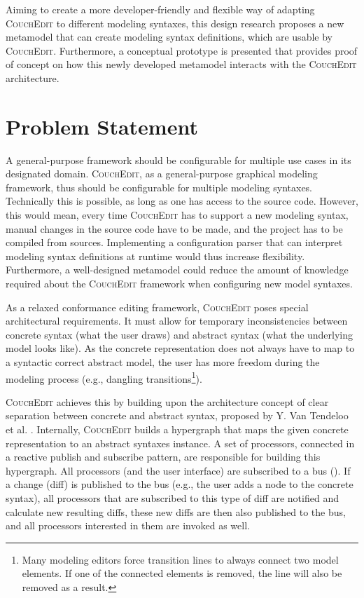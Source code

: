 Aiming to create a more developer-friendly and flexible way of adapting \textsc{CouchEdit} to different modeling syntaxes, this design research proposes a new metamodel that can create modeling syntax definitions, which are usable by \textsc{CouchEdit}. Furthermore, a conceptual prototype is presented that provides proof of concept on how this newly developed metamodel interacts with the \textsc{CouchEdit} architecture.

\section{Problem Statement}
\label{sec:problem_statement}

A general-purpose framework should be configurable for multiple use cases in its designated domain. \textsc{CouchEdit}, as a general-purpose graphical modeling framework, thus should be configurable for multiple modeling syntaxes. Technically this is possible, as long as one has access to the source code. However, this would mean, every time \textsc{CouchEdit} has to support a new modeling syntax, manual changes in the source code have to be made, and the project has to be compiled from sources. Implementing a configuration parser that can interpret modeling syntax definitions at runtime would thus increase flexibility. Furthermore, a well-designed metamodel could reduce the amount of knowledge required about the \textsc{CouchEdit} framework when configuring new model syntaxes.

As a relaxed conformance editing framework, \textsc{CouchEdit} poses special architectural requirements. It must allow for temporary inconsistencies between concrete syntax (what the user draws) and abstract syntax (what the underlying model looks like). As the concrete representation does not always have to map to a syntactic correct abstract model, the user has more freedom during the modeling process (e.g., dangling transitions\footnote{Many modeling editors force transition lines to always connect two model elements. If one of the connected elements is removed, the line will also be removed as a result.}).

\textsc{CouchEdit} achieves this by building upon the architecture concept of clear separation between concrete and abstract syntax, proposed by Y. Van Tendeloo et al. \cite{van_tendeloo_concrete_2017}. Internally, \textsc{CouchEdit} builds a hypergraph that maps the given concrete representation to an abstract syntaxes instance. A set of processors, connected in a reactive publish and subscribe pattern, are responsible for building this hypergraph. All processors (and the user interface) are subscribed to a bus (). If a change (diff) is published to the bus (e.g., the user adds a node to the concrete syntax), all processors that are subscribed to this type of diff are notified and calculate new resulting diffs, these new diffs are then also published to the bus, and all processors interested in them are invoked as well.

